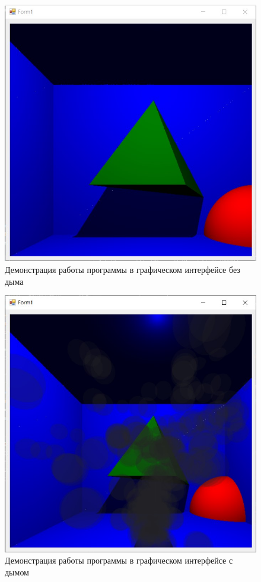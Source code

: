 \captionsetup{justification=centering, singlelinecheck=false}
\begin{figure}[H]
	\centering
	\includegraphics[width=1\linewidth]{inc/img/demographics}
	\caption{Демонстрация работы программы в графическом интерфейсе без дыма}
	\label{fig:demographics}
\end{figure}
\begin{figure}[H]
	\centering
	\includegraphics{inc/img/smoke}
	\caption{Демонстрация работы программы в графическом интерфейсе с дымом}
	\label{fig:smoke}
\end{figure}


